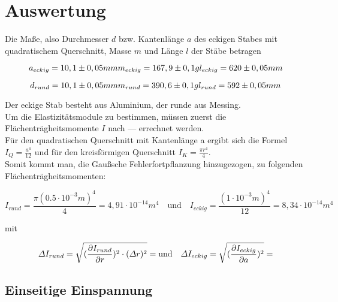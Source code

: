 \section{Auswertung}
\label{sec:Auswertung}

Die Maße, also Durchmesser $d$ bzw. Kantenlänge $a$ des eckigen Stabes mit quadratischem Querschnitt, Masse $m$ und Länge $l$ der Stäbe betragen

\begin{equation}
  a_{eckig} = 10,1 \pm 0,05mm \\
  m_{eckig} = 167,9 \pm 0,1g \\
  l_{eckig} = 620 \pm 0,05mm\\
\end{equation}

\begin{equation}
  d_{rund} = 10,1 \pm 0,05mm \\
  m_{rund} = 390,6 \pm 0,1g \\
  l_{rund} = 592 \pm 0,05mm \\
\end{equation}

Der eckige Stab besteht aus Aluminium, der runde aus Messing.\\
Um die Elastizitätsmodule zu bestimmen, müssen zuerst die Flächenträgheitsmomente $I$ nach --- errechnet werden.\\
Für den quadratischen Querschnitt mit Kantenlänge a ergibt sich die Formel $I_Q = \frac{a^4}{12}$ und 
für den kreisförmigen Querschnitt
$I_K = \frac{\pi r^4}{4}$. \\
Somit kommt man, die Gaußsche Fehlerfortpflanzung hinzugezogen, zu folgenden Flächenträgheitsmomenten:

\begin{equation}
  I_{rund} = \frac{\pi (0.5\cdot 10^{-3}m)^4}{4} = 4,91 \cdot 10^{-14}m^4 \quad 
  \textrm{und} \quad I_{eckig} = \frac{(1 \cdot 10^{-3}m)^4}{12} = 8,34 \cdot 10^{-14}m^4
\end{equation}

mit 

\begin{equation}
  \varDelta I_{rund} =  \sqrt{ (\frac{\partial I_{rund}}{\partial r})^2 \cdot (\varDelta r)^2} =  \\
  \textrm{und} \quad \varDelta I_{eckig} = \sqrt{ (\frac{\partial I_{eckig}}{\partial a})^2 } = 
\end{equation}



\subsection{Einseitige Einspannung}
\label{sec:Einseitige Einspannung}



